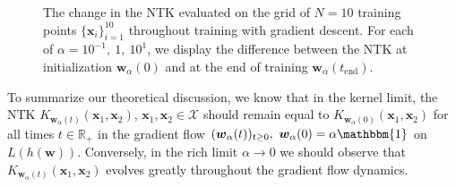 \documentclass{article}
\begin{document}
\begin{figure}[H]
\centering
{}\hfill
{}\par 
{}
\caption{The change in the NTK evaluated on the grid of $N= 10$ training points $\{ \boldsymbol{x}_i \}_{i=1}^{10}$ throughout training with gradient descent. For each of $\alpha = 10^{-1}, \ 1, \ 10^{1}$, we display the difference between the NTK at initialization $\boldsymbol{w}_{\alpha}(0)$ and at the end of training $\boldsymbol{w}_{\alpha}(t_{\text{end}})$.}\label{img:ntkchange}
\end{figure}

To summarize our theoretical discussion, we know that in the kernel limit, the NTK $K_{\boldsymbol{w}_{\alpha}(t)}(\boldsymbol{x}_1, \boldsymbol{x}_2)$, $\boldsymbol{x}_1, \boldsymbol{x}_2 \in \mathcal{X}$ should remain equal to $K_{\boldsymbol{w}_{\alpha}(0)}(\boldsymbol{x}_1, \boldsymbol{x}_2)$ for all times $t \in \mathbb{R}_+$ in the gradient flow $(\boldsymbol{w}_{\alpha}(t))_{t \geq 0}, \ \boldsymbol{w}_{\alpha}(0) = \alpha \mathbbm{1}$ on $L(h(\boldsymbol{w}))$. Conversely, in the rich limit $\alpha \rightarrow 0$ we should observe that $K_{\boldsymbol{w}_{\alpha}(t)}(\boldsymbol{x}_1, \boldsymbol{x}_2)$ evolves greatly throughout the gradient flow dynamics.
\end{document}
